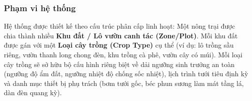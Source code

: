 \subsubsection{Phạm vi hệ thống}
Hệ thống được thiết kế theo cấu trúc phân cấp linh hoạt: Một nông trại được chia thành nhiều \textbf{Khu đất / Lô vườn canh tác (Zone/Plot)}. Mỗi khu đất được gán với một \textbf{Loại cây trồng (Crop Type)} cụ thể (ví dụ: lô trồng sầu riêng, vườn thanh long chong đèn, khu trồng cà phê, vườn cây có múi). Mỗi loại cây trồng sẽ sở hữu bộ cấu hình riêng biệt về dải ngưỡng sinh trưởng an toàn (ngưỡng độ ẩm đất, ngưỡng nhiệt độ chống sốc nhiệt), lịch trình tưới tiêu định kỳ và danh mục thiết bị phụ trách (bơm tưới gốc, béc phun sương làm mát tầng lá, dàn đèn quang kỳ).
